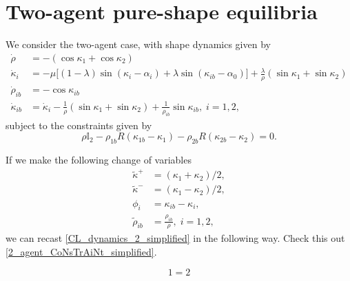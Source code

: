 \section{Two-agent pure-shape equilibria}

We consider the two-agent case, with shape dynamics given by
\begin{equation}
\begin{aligned}
\dot{\rho} &= - (\cos\kappa_1 + \cos\kappa_2) 
\\
\dot{\kappa}_i &= - \mu \Big[(1 - \lambda)\sin(\kappa_i - \alpha_i) + \lambda \sin(\kappa_{ib} - \alpha_0) \Big] + \frac{\lambda}{\rho}(\sin\kappa_1 + \sin\kappa_2) 
\\
\dot{\rho}_{ib} &= - \cos\kappa_{ib}  
\\
\dot{\kappa}_{ib} &= \dot{\kappa}_i - \frac{1}{\rho}(\sin\kappa_1 + \sin\kappa_2) + \frac{1}{\rho_{ib}} \sin\kappa_{ib},  \; i=1,2,
\end{aligned}
\label{CL_dynamics_2_simplified}
\end{equation}
subject to the constraints given by
\begin{equation}
\rho \mathbb{I}_2 - \rho_{1b} R(\kappa_{1b} - \kappa_1) - \rho_{2b} R(\kappa_{2b} - \kappa_{2}) = 0. 
\label{2_agent_CoNsTrAiNt_simplified}
\end{equation}

If we make the following change of variables
\begin{align}
\tilde{\kappa}^+ 
&= (\kappa_1 + \kappa_2)/2,
\\
\tilde{\kappa}^- 
&= 
(\kappa_1 - \kappa_2)/2,
\\
\phi_{i} 
&= 
\kappa_{ib} - \kappa_i,
\\
\tilde{\rho}_{ib} 
&= 
\frac{\rho_{ib} }{\rho}, 
\; i=1,2,
\end{align}
we can recast \eqref{CL_dynamics_2_simplified} in the following way. Check this out \eqref{2_agent_CoNsTrAiNt_simplified}.


\begin{equation}
1 = 2
\end{equation}